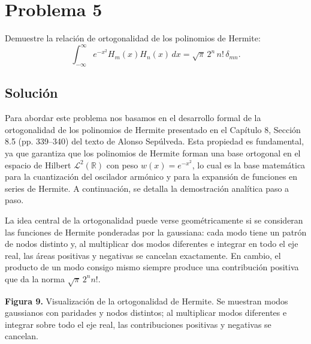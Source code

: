 \documentclass[a4paper]{article}
\begin{document}
\section{Problema 5}
Demuestre la relación de ortogonalidad de los polinomios de Hermite:
$$
\int_{-\infty}^{\infty} e^{-x^2} H_m(x) H_n(x) \, dx = \sqrt{\pi} \, 2^n \, n! \, \delta_{mn}.
$$

\subsection{Solución}
Para abordar este problema nos basamos en el desarrollo formal de la ortogonalidad de los polinomios de Hermite presentado en el Capítulo 8, Sección 8.5 (pp. 339--340) del texto de Alonso Sepúlveda. Esta propiedad es fundamental, ya que garantiza que los polinomios de Hermite forman una base ortogonal en el espacio de Hilbert $\mathcal{L}^2(\mathbb{R})$ con peso $w(x) = e^{-x^2}$, lo cual es la base matemática para la cuantización del oscilador armónico y para la expansión de funciones en series de Hermite. A continuación, se detalla la demostración analítica paso a paso.

La idea central de la ortogonalidad puede verse geométricamente si se consideran las funciones de Hermite ponderadas por la gaussiana: cada modo tiene un patrón de nodos distinto y, al multiplicar dos modos diferentes e integrar en todo el eje real, las áreas positivas y negativas se cancelan exactamente. En cambio, el producto de un modo consigo mismo siempre produce una contribución positiva que da la norma $\sqrt{\pi}\,2^n n!$.

\begin{center}

\small\textbf{Figura 9.} Visualización de la ortogonalidad de Hermite. Se muestran modos gaussianos con paridades y nodos distintos; al multiplicar modos diferentes e integrar sobre todo el eje real, las contribuciones positivas y negativas se cancelan.
\end{center}
\end{document}
